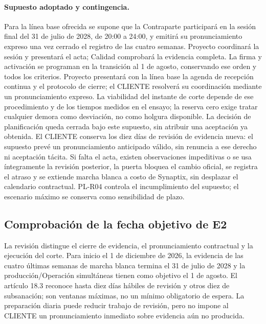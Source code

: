 \paragraph{Supuesto adoptado y contingencia.} Para la línea base ofrecida se supone que la Contraparte participará en la sesión final del 31 de julio de 2028, de 20:00 a 24:00, y emitirá su pronunciamiento expreso una vez cerrado el registro de las cuatro semanas. Proyecto coordinará la sesión y presentará el acta; Calidad comprobará la evidencia completa. La firma y activación se programan en la transición al 1 de agosto, conservando ese orden y todos los criterios. Proyecto presentará con la línea base la agenda de recepción continua y el protocolo de cierre; el CLIENTE resolverá su coordinación mediante un pronunciamiento expreso. La viabilidad del instante de corte depende de ese procedimiento y de los tiempos medidos en el ensayo; la reserva cero exige tratar cualquier demora como desviación, no como holgura disponible. La decisión de planificación queda cerrada bajo este supuesto, sin atribuir una aceptación ya obtenida. El CLIENTE conserva los diez días de revisión de evidencia nueva: el supuesto prevé un pronunciamiento anticipado válido, sin renuncia a ese derecho ni aceptación tácita. Si falta el acta, existen observaciones impeditivas o se usa íntegramente la revisión posterior, la puerta bloquea el cambio oficial, se registra el atraso y se extiende marcha blanca a costo de Synaptix, sin desplazar el calendario contractual. PL-R04 controla el incumplimiento del supuesto; el escenario máximo se conserva como sensibilidad de plazo.




\subsection{Comprobación de la fecha objetivo de E2} %
La revisión distingue el cierre de evidencia, el pronunciamiento contractual y la ejecución del corte. Para inicio el 1 de diciembre de 2026, la evidencia de las cuatro últimas semanas de marcha blanca termina el 31 de julio de 2028 y la producción/Operación simultáneas tienen como objetivo el 1 de agosto. El artículo 18.3 reconoce hasta diez días hábiles de revisión y otros diez de subsanación; son ventanas máximas, no un mínimo obligatorio de espera. La preparación diaria puede reducir trabajo de revisión, pero no impone al CLIENTE un pronunciamiento inmediato sobre evidencia aún no producida.~\parencite[arts.~17.2.4, 17.3 y 18.3; pp.~12--13]{bases-admin}

